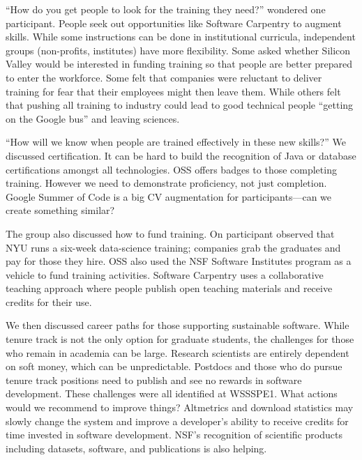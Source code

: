 \documentclass[11pt, oneside]{amsart}
\begin{document}
``How do you get people to look for the training they need?'' wondered one
participant. People seek out opportunities like Software Carpentry to augment
skills. While some instructions can be done in institutional curricula,
independent groups (non-profits, institutes) have more flexibility. Some asked
whether Silicon Valley would be interested in funding training so that people are
better prepared to enter the workforce. Some felt that companies were reluctant
to deliver training for fear that their employees might then leave them. While others felt
that pushing all training to industry could lead to good technical people
``getting on the Google bus'' and leaving sciences.

``How will we know when people are trained effectively in these new skills?'' We
discussed certification. It can be hard to build the recognition of Java or
database certifications amongst all technologies. OSS offers badges to those
completing training. However we need to demonstrate proficiency, not just
completion. Google Summer of Code is a big CV augmentation for
participants---can we create something similar?

The group also discussed how to fund training. On participant observed that NYU
runs a six-week data-science training; companies grab the graduates and pay for
those they hire. OSS also used the NSF Software Institutes program as a vehicle
to fund training activities. Software Carpentry uses a collaborative teaching
approach where people publish open teaching materials and receive credits for
their use.

We then discussed career paths for those supporting sustainable software. While
tenure track is not the only option for graduate students, the challenges for those who
remain in academia can be large. Research scientists are entirely dependent on
soft money, which can be unpredictable. Postdocs and those who do pursue tenure
track positions need to publish and see no rewards in software development.
These challenges were all identified at WSSSPE1. What actions would we recommend
to improve things? Altmetrics and download statistics may slowly change the
system and improve a developer's ability to receive credits for time invested in
software development. NSF's recognition of scientific products including datasets,
software, and publications is also helping.
\end{document}
